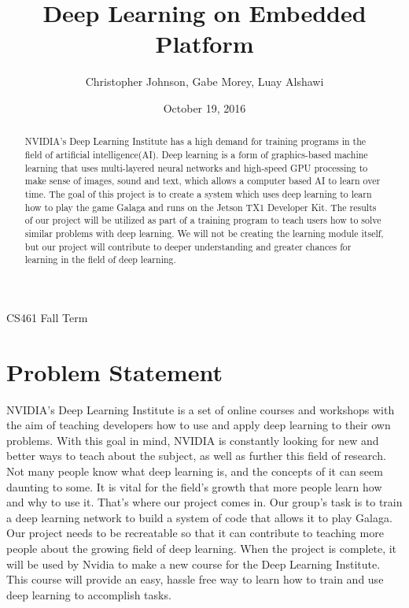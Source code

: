 \documentclass[letterpaper,10pt]{article}
\author{Christopher Johnson, Gabe Morey, Luay Alshawi}
\title{Deep Learning on Embedded Platform}
\date{October 19, 2016}
\begin{document}
\begin{titlingpage}
\maketitle
CS461 Fall Term
\begin{abstract}
NVIDIA's Deep Learning Institute has a high demand for training programs in the field of artificial intelligence(AI). 
Deep learning is a form of graphics-based machine learning that uses multi-layered neural networks and high-speed GPU processing to make sense of images, sound and text, which allows a computer based AI to learn over time. 
The goal of this project is to create a system which uses deep learning to learn how to play the game Galaga and runs on the Jetson TX1 Developer Kit. 
The results of our project will be utilized as part of a training program to teach users how to solve similar problems with deep learning. 
We will not be creating the learning module itself, but our project will contribute to deeper understanding and greater chances for learning in the field of deep learning.
\end{abstract}
\end{titlingpage}

\section{Problem Statement}
NVIDIA’s Deep Learning Institute is a set of online courses and workshops with the aim of teaching developers how to use and apply deep learning to their own problems.
With this goal in mind, NVIDIA is constantly looking for new and better ways to teach about the subject, as well as further this field of research.
Not many people know what deep learning is, and the concepts of it can seem daunting to some.
It is vital for the field's growth that more people learn how and why to use it.
That's where our project comes in.
Our group’s task is to train a deep learning network to build a system of code that allows it to play Galaga.
Our project needs to be recreatable so that it can contribute to teaching more people about the growing field of deep learning.
When the project is complete, it will be used by Nvidia to make a new course for the Deep Learning Institute.
This course will provide an easy, hassle free way to learn how to train and use deep learning to accomplish tasks.
 
\end{document}
